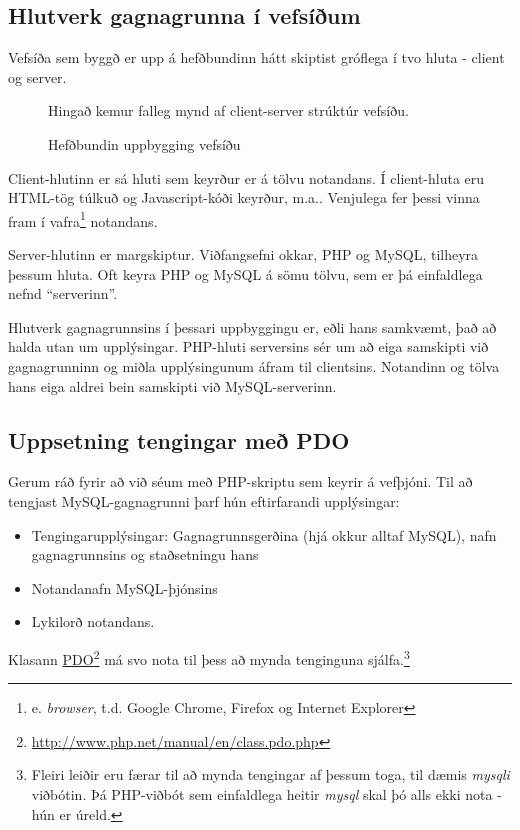 \subsection{Hlutverk gagnagrunna í vefsíðum}
Vefsíða sem byggð er upp á hefðbundinn hátt skiptist gróflega í tvo hluta - client og server. 

\begin{figure}
\centering
\caption{Hefðbundin uppbygging vefsíðu}
\label{mynd:uppbyggingvefsidu}
\color{red} Hingað kemur falleg mynd af client-server strúktúr vefsíðu.
\end{figure}

Client-hlutinn er sá hluti sem keyrður er á tölvu notandans. Í client-hluta eru HTML-tög túlkuð og Javascript-kóði keyrður, m.a.. Venjulega fer þessi vinna fram í vafra\footnote{e. \emph{browser}, t.d. Google Chrome, Firefox og Internet Explorer} notandans.

Server-hlutinn er margskiptur. Viðfangsefni okkar, PHP og MySQL, tilheyra þessum hluta. Oft keyra PHP og MySQL á sömu tölvu, sem er þá einfaldlega nefnd ``serverinn''.

Hlutverk gagnagrunnsins í þessari uppbyggingu er, eðli hans samkvæmt, það að halda utan um upplýsingar. PHP-hluti serversins sér um að eiga samskipti við gagnagrunninn og miðla upplýsingunum áfram til clientsins. Notandinn og tölva hans eiga aldrei bein samskipti við MySQL-serverinn.

\subsection{Uppsetning tengingar með PDO}
Gerum ráð fyrir að við séum með PHP-skriptu sem keyrir á vefþjóni. Til að tengjast MySQL-gagnagrunni þarf hún eftirfarandi upplýsingar:
\begin{itemize}
 \item Tengingarupplýsingar: Gagnagrunnsgerðina (hjá okkur alltaf MySQL), nafn gagnagrunnsins og staðsetningu hans
 \item Notandanafn MySQL-þjónsins
 \item Lykilorð notandans.
\end{itemize}
Klasann \href{http://www.php.net/manual/en/class.pdo.php}{PDO}\footnote{\url{http://www.php.net/manual/en/class.pdo.php}} má svo nota til þess að mynda tenginguna sjálfa.\footnote{Fleiri leiðir eru færar til að mynda tengingar af þessum toga, til dæmis \emph{mysqli} viðbótin. Þá PHP-viðbót sem einfaldlega heitir \emph{mysql} skal þó alls ekki nota - hún er úreld.}

